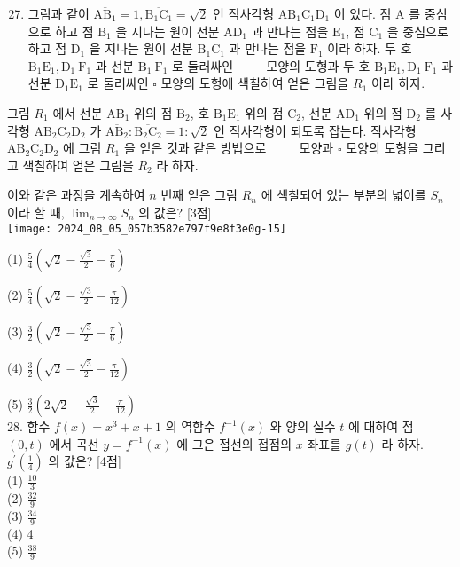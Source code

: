 \documentclass[10pt]{article}
\begin{document}
\begin{enumerate}
  \setcounter{enumi}{26}
  \item 그림과 같이 \(\overline{\mathrm{AB}_{1}}=1, \overline{\mathrm{B}_{1} \mathrm{C}_{1}}=\sqrt{2}\) 인 직사각형 \(\mathrm{AB}_{1} \mathrm{C}_{1} \mathrm{D}_{1}\) 이 있다. 점 A 를 중심으로 하고 점 \(\mathrm{B}_{1}\) 을 지나는 원이 선분 \(\mathrm{AD}_{1}\) 과 만나는 점을 \(\mathrm{E}_{1}\), 점 \(\mathrm{C}_{1}\) 을 중심으로 하고 점 \(\mathrm{D}_{1}\) 을 지나는 원이 선분 \(\mathrm{B}_{1} \mathrm{C}_{1}\) 과 만나는 점을 \(\mathrm{F}_{1}\) 이라 하자. 두 호 \(\mathrm{B}_{1} \mathrm{E}_{1}, \mathrm{D}_{1} \mathrm{~F}_{1}\) 과 선분 \(\mathrm{B}_{1} \mathrm{~F}_{1}\) 로 둘러싸인 \(\qquad\) 모양의 도형과 두 호 \(\mathrm{B}_{1} \mathrm{E}_{1}, \mathrm{D}_{1} \mathrm{~F}_{1}\) 과 선분 \(\mathrm{D}_{1} \mathrm{E}_{1}\) 로 둘러싸인 \(\square\) 모양의 도형에 색칠하여 얻은 그림을 \(R_{1}\) 이라 하자.
\end{enumerate}

그림 \(R_{1}\) 에서 선분 \(\mathrm{AB}_{1}\) 위의 점 \(\mathrm{B}_{2}\), 호 \(\mathrm{B}_{1} \mathrm{E}_{1}\) 위의 점 \(\mathrm{C}_{2}\), 선분 \(\mathrm{AD}_{1}\) 위의 점 \(\mathrm{D}_{2}\) 를 사각형 \(\mathrm{AB}_{2} \mathrm{C}_{2} \mathrm{D}_{2}\) 가 \(\overline{\mathrm{AB}_{2}}: \overline{\mathrm{B}_{2} \mathrm{C}_{2}}=1: \sqrt{2}\) 인 직사각형이 되도록 잡는다. 직사각형 \(\mathrm{AB}_{2} \mathrm{C}_{2} \mathrm{D}_{2}\) 에 그림 \(R_{1}\) 을 얻은 것과 같은 방법으로 \(\qquad\) 모양과 \(\square\) 모양의 도형을 그리고 색칠하여 얻은 그림을 \(R_{2}\) 라 하자.

이와 같은 과정을 계속하여 \(n\) 번째 얻은 그림 \(R_{n}\) 에 색칠되어 있는 부분의 넓이를 \(S_{n}\) 이라 할 때, \(\lim _{n \rightarrow \infty} S_{n}\) 의 값은? [3점]\\
\texttt{[image: 2024\_08\_05\_057b3582e797f9e8f3e0g-15]}

(1) \(\frac{5}{4}\left(\sqrt{2}-\frac{\sqrt{3}}{2}-\frac{\pi}{6}\right)\)

(2) \(\frac{5}{4}\left(\sqrt{2}-\frac{\sqrt{3}}{2}-\frac{\pi}{12}\right)\)

(3) \(\frac{3}{2}\left(\sqrt{2}-\frac{\sqrt{3}}{2}-\frac{\pi}{6}\right)\)

(4) \(\frac{3}{2}\left(\sqrt{2}-\frac{\sqrt{3}}{2}-\frac{\pi}{12}\right)\)

(5) \(\frac{3}{2}\left(2 \sqrt{2}-\frac{\sqrt{3}}{2}-\frac{\pi}{12}\right)\)\\
28. 함수 \(f(x)=x^{3}+x+1\) 의 역함수 \(f^{-1}(x)\) 와 양의 실수 \(t\) 에 대하여 점 \((0, t)\) 에서 곡선 \(y=f^{-1}(x)\) 에 그은 접선의 접점의 \(x\) 좌표를 \(g(t)\) 라 하자. \(g^{\prime}\left(\frac{1}{4}\right)\) 의 값은? [4점]\\
(1) \(\frac{10}{3}\)\\
(2) \(\frac{32}{9}\)\\
(3) \(\frac{34}{9}\)\\
(4) 4\\
(5) \(\frac{38}{9}\)
\end{document}
